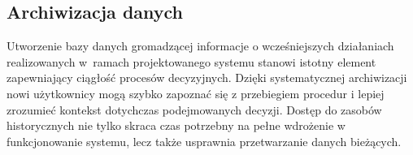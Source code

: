 \subsection{Archiwizacja danych}
Utworzenie bazy danych gromadzącej informacje o wcześniejszych działaniach realizowanych w~ramach projektowanego systemu stanowi istotny element zapewniający ciągłość procesów decyzyjnych. Dzięki systematycznej archiwizacji nowi użytkownicy mogą szybko zapoznać się z przebiegiem procedur i lepiej zrozumieć kontekst dotychczas podejmowanych decyzji. Dostęp do zasobów historycznych nie tylko skraca czas potrzebny na pełne wdrożenie w funkcjonowanie systemu, lecz także usprawnia przetwarzanie danych bieżących.